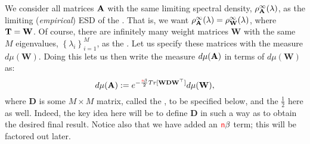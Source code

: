 We consider all matrices $\mathbf{\mathbf{A}}$ with the same limiting spectral density, $\rho_{\mathbf{A}}^{\infty}(\lambda)$,
as the limiting (\emph{empirical}) ESD of the \Teacher.
That is, we want $\rho_{\mathbf{A}}^{\infty}(\lambda)=\rho^{\infty}_{{\mathbf{W}}}(\lambda)$, where ${\mathbf{T}}={\mathbf{W}}$.
Of course, there are infinitely many weight matrices $\mathbf{W}$ with the same $M$ eigenvalues, $\left\{ \lambda_{i} \right\}_{i=1}^{M}$, as the \Teacher.
Let us specify these matrices with the measure $d\mu(\mathbf{W})$.
Doing this lets us then write the measure $d\mu(\mathbf{\mathbf{A}})$ in terms of $d\mu(\mathbf{W})$ as:
\begin{equation}
\label{eqn:dmuA}
d\mu(\mathbf{\mathbf{A}}) 
   := e^{- \frac{{\color{red}\sf{n}}\beta}{2} Tr[\mathbf{W}\mathbf{D}\mathbf{W}^{\top}]} d\mu(\mathbf{W})  ,
\end{equation}
where $\mathbf{D}$ is some $M \times M$ matrix, called the \SourceMatrix, to be specified below,
and the $\tfrac{1}{2}$ here as well.
Indeed, the key idea here will be to define $\mathbf{D}$ in such a way as to obtain the desired final result.
Notice also that we have added an ${\color{red}\sf{n}}\beta$ term; this will be factored out later.


